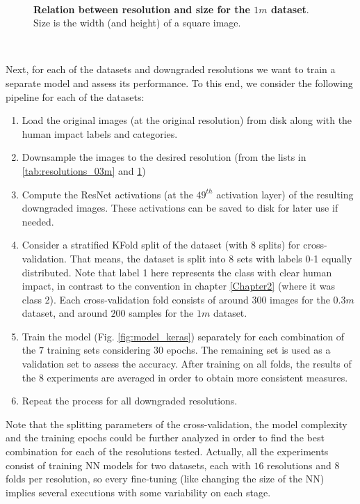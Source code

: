 \

\begin{figure}[H]
	\centering
	
	\captionsetup{width=1\linewidth}
	\caption{\textbf{Relation between resolution and size for the $1m$ dataset}. Size is the width (and height) of a square image.}
	\label{tab:resolutions_1m}
\end{figure}

\

Next, for each of the datasets and downgraded resolutions we want to train a separate model and assess its performance. To this end, we consider the following pipeline for each of the datasets:

\begin{enumerate}
	\item Load the original images (at the original resolution) from disk along with the human impact labels and categories.
	
	\item Downsample the images to the desired resolution (from the lists in \ref{tab:resolutions_03m} and \ref{tab:resolutions_1m})
	
	\item Compute the ResNet activations (at the $49^{th}$ activation layer) of the resulting downgraded images. These activations can be saved to disk for later use if needed.
	
	\item Consider a stratified KFold split of the dataset (with $8$ splits) for cross-validation. That means, the dataset is split into $8$ sets with labels 0-1 equally distributed. Note that label 1 here represents the class with clear human impact, in contrast to the convention in chapter \ref{Chapter2} (where it was class 2).  Each cross-validation fold consists of around $300$ images for the $0.3m$ dataset, and around $200$ samples for the $1m$ dataset.
	
	\item Train the model (Fig. \ref{fig:model_keras}) separately for each combination of the $7$ training sets considering 30 epochs. The remaining set is used as a validation set to assess the accuracy. After training on all folds, the results of the $8$ experiments are averaged in order to obtain more consistent measures.
	
	\item Repeat the process for all downgraded resolutions.
\end{enumerate}

Note that the splitting parameters of the cross-validation, the model complexity and the training epochs could be further analyzed in order to find the best combination for each of the resolutions tested. Actually, all the experiments consist of training NN models for two datasets, each with $16$ resolutions and $8$ folds per resolution, so every fine-tuning (like changing the size of the NN) implies several executions with some variability on each stage.


